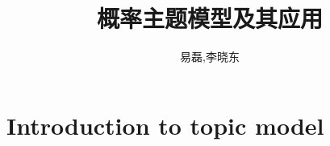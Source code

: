 \documentclass[hyperref={unicode}]{beamer}
\begin{document}
\begin{CJK}{UTF8}{gkai}


\title{概率主题模型及其应用}
\author[YiLei,LiXiaodong]{易磊,李晓东}
\renewcommand{\today}{ May 24, 2012}

\begin{frame}
  \maketitle
\end{frame}


\section{Introduction to topic model}

\end{CJK}
\end{document}
